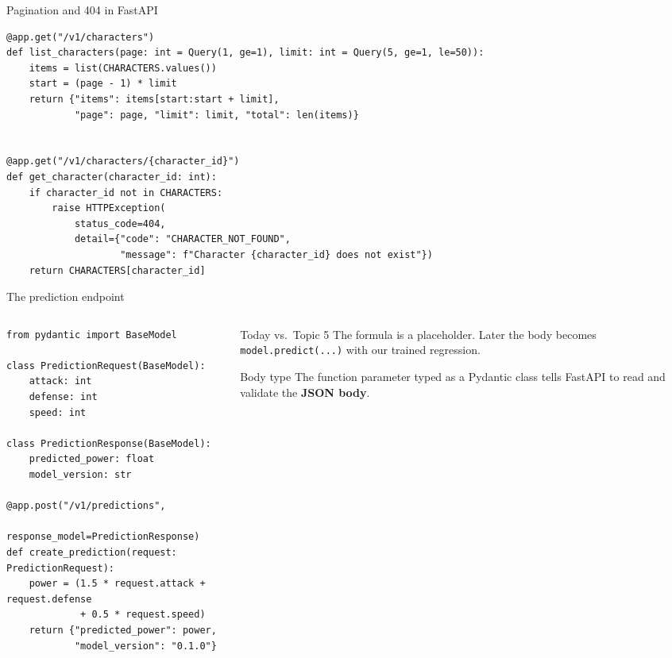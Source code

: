 \documentclass[aspectratio=169,10pt]{beamer}
\begin{document}
\begin{frame}[fragile]{Pagination and 404 in FastAPI}
\begin{lstlisting}
@app.get("/v1/characters")
def list_characters(page: int = Query(1, ge=1), limit: int = Query(5, ge=1, le=50)):
    items = list(CHARACTERS.values())
    start = (page - 1) * limit
    return {"items": items[start:start + limit],
            "page": page, "limit": limit, "total": len(items)}


@app.get("/v1/characters/{character_id}")
def get_character(character_id: int):
    if character_id not in CHARACTERS:
        raise HTTPException(
            status_code=404,
            detail={"code": "CHARACTER_NOT_FOUND",
                    "message": f"Character {character_id} does not exist"})
    return CHARACTERS[character_id]
\end{lstlisting}
\end{frame}

\begin{frame}[fragile]{The prediction endpoint}
\begin{columns}[T]
\begin{column}{0.58\textwidth}
\begin{lstlisting}
from pydantic import BaseModel

class PredictionRequest(BaseModel):
    attack: int
    defense: int
    speed: int

class PredictionResponse(BaseModel):
    predicted_power: float
    model_version: str

@app.post("/v1/predictions",
          response_model=PredictionResponse)
def create_prediction(request: PredictionRequest):
    power = (1.5 * request.attack + request.defense
             + 0.5 * request.speed)
    return {"predicted_power": power,
            "model_version": "0.1.0"}
\end{lstlisting}
\end{column}
\begin{column}{0.38\textwidth}
\begin{alertblock}{Today vs.\ Topic 5}
The formula is a placeholder. Later the body becomes \texttt{model.predict(...)} with our trained regression.
\end{alertblock}
\begin{block}{Body type}
The function parameter typed as a Pydantic class tells FastAPI to read and validate the \textbf{JSON body}.
\end{block}
\end{column}
\end{columns}
\end{frame}
\end{document}
